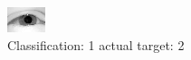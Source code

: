 \begin{figure}[h!]
\begin{center}
\includegraphics[width=0.60\columnwidth]{figures/ID2313_class_1_target_2.png}
\end{center}
\caption{ Classification: 1 actual target: 2}
\label{fig:ID2313_class_1_target_2}
\end{figure}
